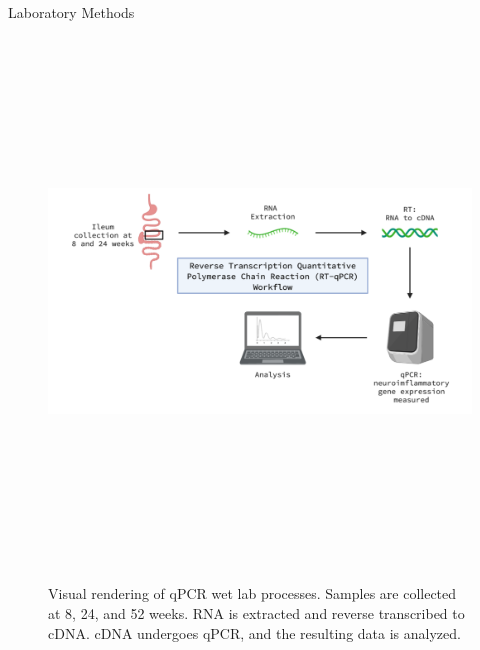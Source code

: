 \documentclass[final]{beamer}
\newlength{\colwidth}
\begin{document}
\begin{frame}[t]
\begin{columns}[t]
\begin{column}{\colwidth}
\begin{block}{Laboratory Methods}
  \begin{figure}[tph!]
    {\includegraphics[height=14cm]{assets/qPCR_methods}}
    \caption{Visual rendering of qPCR wet lab processes. Samples are collected at 8, 24, and 52 weeks. RNA is extracted and reverse transcribed to cDNA. cDNA undergoes qPCR, and the resulting data is analyzed.}
    \label{fig:qpcrMethods}
  \end{figure}


\end{block}
\end{column}
\end{columns}
\end{frame}
\end{document}
